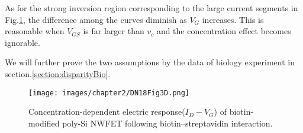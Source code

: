 As for the strong inversion region corresponding to the large current segments in Fig.\ref{fig:DN17Fig6d}, the difference among the curves diminish as $V_G$ increases.
This is reasonable when $V_{GS}$ is far larger than $v_c$ and the concentration effect becomes ignorable.

We will further prove the two assumptions by the data of biology experiment in section.\ref{section:disparityBio}.

\begin{figure}[!htbp]
    \centering
    \texttt{[image: images/chapter2/DN18Fig3D.png]}
    \caption{Concentration-dependent electric response($I_D-V_G$) of biotin-modified poly-Si NWFET following biotin–streptavidin interaction.\cite{DN17}}
    \label{fig:DN17Fig6d}
\end{figure}










%

